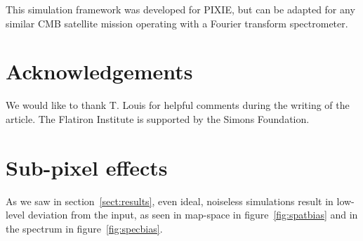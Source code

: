 \documentclass{article}
\begin{document}
This simulation framework was developed for PIXIE, but can be
adapted for any similar CMB satellite mission operating with a Fourier
transform spectrometer.

\section*{Acknowledgements}
We would like to thank T. Louis for helpful comments
during the writing of the article. The Flatiron Institute is supported by the
Simons Foundation.




\pagebreak

\appendix

\section{Sub-pixel effects}
\label{sect:subpix}
As we saw in section~\ref{sect:results}, even ideal, noiseless
simulations result in low-level deviation from the input, as
seen in map-space in figure~\ref{fig:spatbias} and in the
spectrum in figure~\ref{fig:specbias}.
\end{document}

